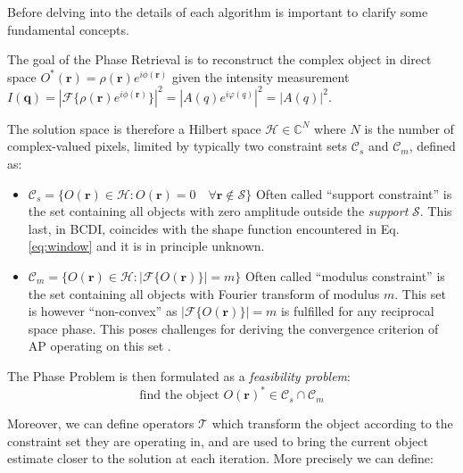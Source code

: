 Before delving into the details of each algorithm is important to clarify some fundamental concepts.

The goal of the Phase Retrieval is to reconstruct the complex object in direct space $O^{\ast}(\mathbf{r}) = \rho(\mathbf{r})e^{i\phi(\mathbf{r})}$
given the intensity measurement $I(\mathbf{q}) = |\mathcal{F}\{\rho(\mathbf{r})e^{i\phi(\mathbf{r})}\}|^2 = |A(q)e^{i\varphi(q)}|^2 = |A(q)|^2 $. 

The solution space is therefore a Hilbert space $\mathcal{H} \in \mathbb{C}^N$ where $N$ is the number of complex-valued pixels,
limited by typically two constraint sets $\mathcal{C}_s$ and $\mathcal{C}_m$, defined as:
\begin{itemize}
    \item $\mathcal{C}_s = \{ O(\mathbf{r}) \in \mathcal{H} : O(\mathbf{r}) = 0 \quad \forall \mathbf{r} \notin \mathcal{S} \}$ 
    Often called ``support constraint'' is the set containing all objects with zero amplitude outside the \textit{support} $\mathcal{S}$. 
    This last, in BCDI, coincides with the shape function encountered in Eq.\ref{eq:window} and it is in principle unknown.  

    \item $\mathcal{C}_m = \{ O(\mathbf{r}) \in \mathcal{H} : |\mathcal{F}\{O(\mathbf{r})\}| = m \}$ Often called ``modulus 
    constraint'' is the set containing all objects with Fourier transform of modulus $m$. This set is however ``non-convex''
    as $|\mathcal{F}\{O(\mathbf{r})\}| = m$ is fulfilled for any reciprocal space phase. This poses challenges for deriving 
    the convergence criterion of AP operating on this set \cite{Luke2002}.
    
\end{itemize}
The Phase Problem is then formulated as a \textit{feasibility problem}: 
\begin{equation}
    \text{find the object  } O(\mathbf{r})^{\ast} \in \mathcal{C}_s \cap \mathcal{C}_m
\end{equation}

Moreover, we can define operators $\mathbf{\mathcal{T}}$ which transform the object according to the constraint set 
they are operating in, and are used to bring the current object estimate closer to the solution at each iteration. 
More precisely we can define: 

